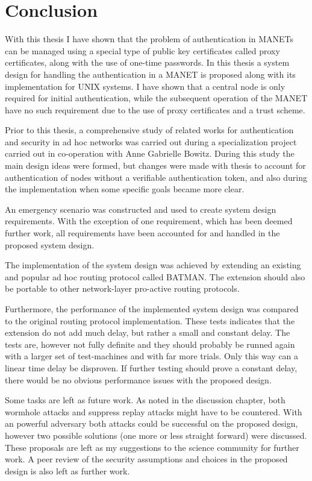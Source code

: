 \chapter{Conclusion}
\label{ch:conclusion}
\acresetall

With this thesis I have shown that the problem of authentication in \aclp{MANET}
can be managed using a special type of public key certificates called proxy
certificates, along with the use of one-time passwords. In this thesis a system
design for handling the authentication in a MANET is proposed along with its
implementation for UNIX systems. I have shown that a central node is only
required for initial authentication, while the subsequent operation of the MANET
have no such requirement due to the use of proxy certificates and a trust
scheme.

Prior to this thesis, a comprehensive study of related works for authentication
and security in ad hoc networks was carried out during a specialization project
carried out in co-operation with Anne Gabrielle Bowitz. During this study the
main design ideas were formed, but changes were made with thesis to account for
authentication of nodes without a verifiable authentication token, and also
during the implementation when some specific goals became more clear.

An emergency scenario was constructed and used to create system design
requirements. With the exception of one requirement, which has been deemed
further work, all requirements have been accounted for and handled in the
proposed system design.

The implementation of the system design was achieved by extending an existing
and popular ad hoc routing protocol called BATMAN. The extension should also be
portable to other network-layer pro-active routing protocols.

Furthermore, the performance of the implemented system design was compared
to the original routing protocol implementation. These tests indicates that the
extension do not add much delay, but rather a small and constant delay. The
tests are, however not fully definite and they should probably be runned again
with a larger set of test-machines and with far more trials. Only this way can a
linear time delay be disproven. If further testing should prove a constant
delay, there would be no obvious performance issues with the proposed design.

Some tasks are left as future work. As noted in the discussion chapter, both
wormhole attacks and suppress replay attacks might have to be countered. With an
powerful adversary both attacks could be successful on the proposed design,
however two possible solutions (one more or less straight forward) were
discussed. These proposals are left as my suggestions to the science community
for further work. A peer review of the security assumptions and choices in the
proposed design is also left as further work.
